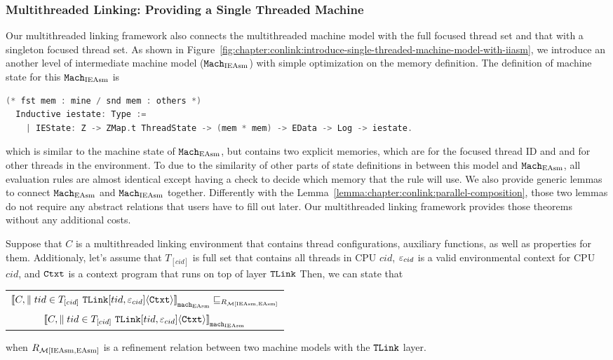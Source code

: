 \subsubsection{Multithreaded Linking: Providing a Single Threaded Machine}

Our multithreaded linking framework also connects the multithreaded machine model with the full focused thread set 
and that with a singleton focused thread set. 
As shown in Figure~\ref{fig:chapter:conlink:introduce-single-threaded-machine-model-with-iiasm},
we introduce an another level of intermediate machine model (${\mathrm{\texttt{Mach}}}_{\mathrm{IEAsm}}$) with
simple optimization on the memory definition.
The definition of machine state for this ${\mathrm{\texttt{Mach}}}_{\mathrm{IEAsm}}$ is 
\begin{lstlisting}[language=C]
  (* fst mem : mine / snd mem : others *)
  Inductive iestate: Type :=
    | IEState: Z -> ZMap.t ThreadState -> (mem * mem) -> EData -> Log -> iestate.
\end{lstlisting}
which is similar to the machine state of ${\mathrm{\texttt{Mach}}}_{\mathrm{EAsm}}$, but 
contains two explicit memories, which are for the focused thread ID and 
and for other threads in the environment.
To due to the similarity of other parts of state definitions in between this model and ${\mathrm{\texttt{Mach}}}_{\mathrm{EAsm}}$, 
all evaluation rules are almost identical except having a check to decide which memory that the rule will use. 
We also provide generic lemmas to connect ${\mathrm{\texttt{Mach}}}_{\mathrm{EAsm}}$ and ${\mathrm{\texttt{Mach}}}_{\mathrm{IEAsm}}$ together. 
Differently with the Lemma~\ref{lemma:chapter:conlink:parallel-composition},
those two lemmas
do not require any abstract relations that
users have to fill out later. 
Our multithreaded linking framework provides those theorems without any additional costs. 

\begin{lemma}
\label{lemma:chapter:conlink:easm-refines-iieasm}
Suppose that $C$ is a multithreaded linking environment that contains thread configurations, auxiliary functions, as well as properties for them. 
Additionaly, let's assume that  $T_{[cid]}$ is full set that contains all threads in CPU $cid$, 
 ${\varepsilon}_{cid}$ is a valid
environmental context for CPU $cid$,
and ${\mathrm{\texttt{Ctxt}}}$ is a
context program that runs on top of layer ${{\mathrm{\texttt{TLink}}}}$
 Then, we can state that
 \begin{center}
\begin{tabular}{c}
${[\![{C, \parallel tid \in T_{[cid]} \  {{\mathrm{\texttt{TLink}}}}[tid, {\varepsilon}_{cid}]} \langle {{\mathrm{\texttt{Ctxt}}}} \rangle]\!]}_{{{\mathrm{\texttt{mach}}}_{\mathrm{EAsm}}}} \sqsubseteq_{R_{\mathcal{M}{[\mathrm{IEAsm}, \mathrm{EAsm}]}}}$\\ 
${[\![{C, \parallel tid \in T_{[cid]} \  {{\mathrm{\texttt{TLink}}}}[tid, {\varepsilon}_{cid}]} \langle {{\mathrm{\texttt{Ctxt}}}} \rangle]\!]}_{{{\mathrm{\texttt{mach}}}_{\mathrm{IEAsm}}}}$\\
\end{tabular}
\end{center}
when $R_{\mathcal{M}{[\mathrm{IEAsm}, \mathrm{EAsm}]}}$ is a refinement relation between two machine models with the ${{\mathrm{\texttt{TLink}}}}$ layer.
\end{lemma}


